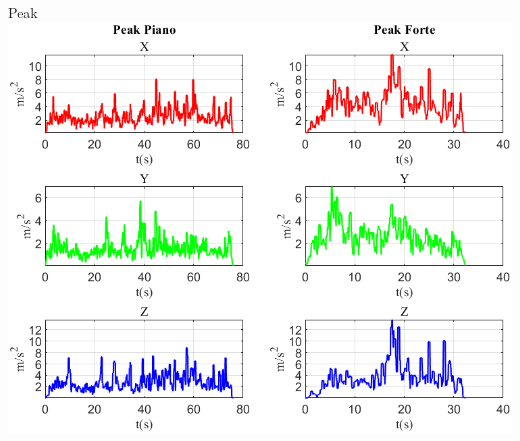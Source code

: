 \documentclass[beamer]{standalone}
\begin{document}

	\begin{frame}{{Peak}}
		\centering\includegraphics[height=.8\textheight]{figure/Acc/Peak}
	\end{frame}
	
%	
%	
%	
%	
%	
	
\end{document}
